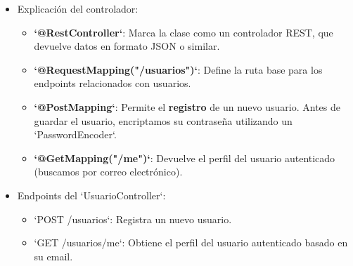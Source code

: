 \documentclass[11pt]{article}
\begin{document}
\begin{itemize}
\begin{verbatim}
import jakarta.validation.Valid;

@RestController
@RequestMapping("/usuarios")
public class UsuarioController {

    @Autowired
    private UsuarioRepository usuarioRepository;

    @Autowired
    private PasswordEncoder passwordEncoder;

    // Registrar un nuevo usuario
    @PostMapping
    public ResponseEntity<Usuario> registrarUsuario(
@RequestBody @Valid Usuario usuario) {
        // Encriptar la contraseña antes de guardar
        usuario.setPassword(passwordEncoder
                            .encode(usuario.getPassword()));
        return ResponseEntity.ok(usuarioRepository.save(usuario));
    }

    // Obtener el perfil del usuario autenticado
    @GetMapping("/me")
    public ResponseEntity<Usuario> obtenerMiPerfil(
@RequestParam("email") String email) {
        return usuarioRepository.findByEmail(email)
                .map(ResponseEntity::ok)
                .orElse(ResponseEntity.notFound().build());
    }
}
\end{verbatim}

\item Explicación del controlador:
\label{sec:org6343d36}
\begin{itemize}
\item \textbf{\textbf{`@RestController`}}: Marca la clase como un controlador REST, que devuelve datos en formato JSON o similar.
\item \textbf{\textbf{`@RequestMapping("/usuarios")`}}: Define la ruta base para los endpoints relacionados con usuarios.
\item \textbf{\textbf{`@PostMapping`}}: Permite el \textbf{\textbf{registro}} de un nuevo usuario. Antes de guardar el usuario, encriptamos su contraseña utilizando un `PasswordEncoder`.
\item \textbf{\textbf{`@GetMapping("/me")`}}: Devuelve el perfil del usuario autenticado (buscamos por correo electrónico).
\end{itemize}

\item Endpoints del `UsuarioController`:
\label{sec:org60f898f}
\begin{itemize}
\item `POST /usuarios`: Registra un nuevo usuario.
\item `GET /usuarios/me`: Obtiene el perfil del usuario autenticado basado en su email.
\end{itemize}


\end{itemize}
\end{document}
